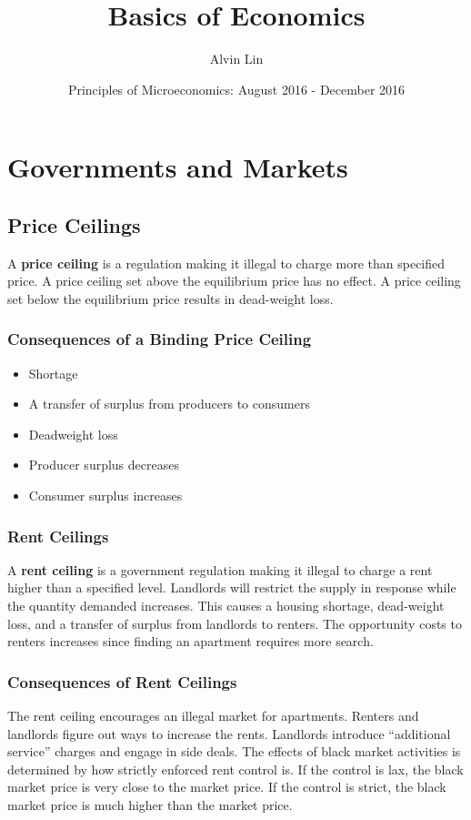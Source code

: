 \documentclass{article}
\title{Basics of Economics}
\author{Alvin Lin}
\date{Principles of Microeconomics: August 2016 - December 2016}
\begin{document}
\maketitle

\section{Governments and Markets}

\subsection{Price Ceilings}
A \textbf{price ceiling} is a regulation making it illegal to charge more than
specified price. A price ceiling set above the equilibrium price has no effect.
A price ceiling set below the equilibrium price results in dead-weight loss.

\subsubsection{Consequences of a Binding Price Ceiling}
\begin{itemize}
  \item Shortage
  \item A transfer of surplus from producers to consumers
  \item Deadweight loss
  \item Producer surplus decreases
  \item Consumer surplus increases
\end{itemize}

\subsubsection{Rent Ceilings}
A \textbf{rent ceiling} is a government regulation making it illegal to charge
a rent higher than a specified level. Landlords will restrict the supply in
response while the quantity demanded increases. This causes a housing shortage,
dead-weight loss, and a transfer of surplus from landlords to renters. The
opportunity costs to renters increases since finding an apartment requires more
search.

\subsubsection{Consequences of Rent Ceilings}
The rent ceiling encourages an illegal market for apartments. Renters and
landlords figure out ways to increase the rents. Landlords introduce
``additional service'' charges and engage in side deals. The effects of black
market activities is determined by how strictly enforced rent control is.
If the control is lax, the black market price is very close to the market price.
If the control is strict, the black market price is much higher than the market
price.
\end{document}
